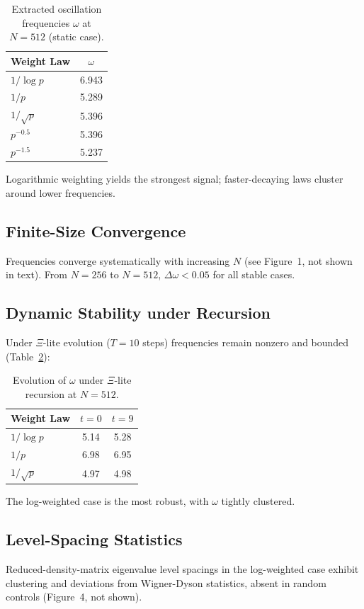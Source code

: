 \documentclass[11pt, a4paper]{article}
\begin{document}
\begin{table}[htbp]
\centering
\caption{Extracted oscillation frequencies \(\omega\) at \(N=512\) (static case).}
\label{tab:static}
\begin{tabular}{lc}
\toprule
Weight Law & \(\omega\) \\
\midrule
\(1/\log p\) & 6.943 \\
\(1/p\)      & 5.289 \\
\(1/\sqrt{p}\) & 5.396 \\
\(p^{-0.5}\) & 5.396 \\
\(p^{-1.5}\) & 5.237 \\
\bottomrule
\end{tabular}
\end{table}

Logarithmic weighting yields the strongest signal; faster-decaying laws cluster around lower frequencies.

\subsection{Finite-Size Convergence}
Frequencies converge systematically with increasing \(N\) (see Figure~1, not shown in text). From \(N=256\) to \(N=512\), \(\Delta\omega < 0.05\) for all stable cases.

\subsection{Dynamic Stability under Recursion}
Under \(\Xi\)-lite evolution (\(T=10\) steps) frequencies remain nonzero and bounded (Table~\ref{tab:dynamic}):

\begin{table}[htbp]
\centering
\caption{Evolution of \(\omega\) under \(\Xi\)-lite recursion at \(N=512\).}
\label{tab:dynamic}
\begin{tabular}{lcc}
\toprule
Weight Law & \(t=0\) & \(t=9\) \\
\midrule
\(1/\log p\) & 5.14 & 5.28 \\
\(1/p\)      & 6.98 & 6.95 \\
\(1/\sqrt{p}\) & 4.97 & 4.98 \\
\bottomrule
\end{tabular}
\end{table}

The log-weighted case is the most robust, with \(\omega\) tightly clustered.

\subsection{Level-Spacing Statistics}
Reduced-density-matrix eigenvalue level spacings in the log-weighted case exhibit clustering and deviations from Wigner-Dyson statistics, absent in random controls (Figure~4, not shown).
\end{document}
